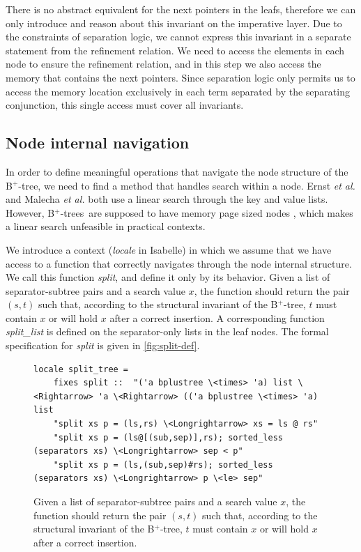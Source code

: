 \documentclass[a4paper,UKenglish,cleveref, autoref, thm-restate]{lipics-v2021}
\newcommand{\btree}{B$^+$-tree}
\newcommand{\btrees}{B$^+$-trees}
\begin{document}
There is no abstract equivalent for the next pointers in the leafs,
therefore we can only introduce and reason about this invariant on the imperative layer.
Due to the constraints of separation logic, we cannot express this invariant
in a separate statement from the refinement relation.
We need to access the elements in each node to ensure the refinement relation,
and in this step we also access the memory that contains the next pointers.
Since separation logic only permits us to access the memory location
exclusively in each term separated by the separating conjunction, this single access 
must cover all invariants.


\subsection{Node internal navigation}
\label{sec:split}

In order to define meaningful operations that navigate
the node structure of the \btree,
we need to find a method that handles search within a node.
Ernst \emph{et al.} \cite{DBLP:journals/sosym/ErnstSR15} and Malecha \emph{et al.} \cite{DBLP:conf/popl/MalechaMSW10}
both use a linear search through the key and value lists.
However, \btrees\ are supposed to have memory page sized nodes \cite{DBLP:journals/csur/Comer79}, 
which makes a linear search unfeasible in practical contexts.

We introduce a context (\emph{locale} in Isabelle) in which we assume that we
have access to a function that correctly navigates through the node internal structure.
We call this function \emph{split}, and define it only by its behavior.
Given a list of separator-subtree pairs and a search value $x$, the function should return the pair $(s,t)$ such that,
according to the structural invariant of the \btree, $t$ must contain $x$ or will hold $x$ after a correct insertion.
A corresponding function \emph{split\_list} is defined on the separator-only lists in the leaf nodes.
The formal specification for \emph{split} is given in \autoref{fig:split-def}.

\begin{figure}
   \centering 
\begin{lstlisting}[mathescape=true, language=Isabelle,label=lst:split-def]
locale split_tree =
    fixes split ::  "('a bplustree \<times> 'a) list \<Rightarrow> 'a \<Rightarrow> (('a bplustree \<times> 'a) list 
    "split xs p = (ls,rs) \<Longrightarrow> xs = ls @ rs" 
    "split xs p = (ls@[(sub,sep)],rs); sorted_less (separators xs) \<Longrightarrow> sep < p" 
    "split xs p = (ls,(sub,sep)#rs); sorted_less (separators xs) \<Longrightarrow> p \<le> sep" 

\end{lstlisting}
    \caption[Definition of \emph{split}]{
        Given a list of separator-subtree pairs and a search value $x$, the function should return the pair $(s,t)$ such that,
        according to the structural invariant of the \btree, $t$ must contain $x$ or will hold $x$ after a correct insertion.
    }
    \label{fig:split-def}
\end{figure}
\end{document}
